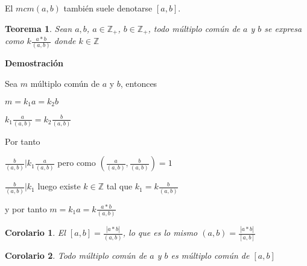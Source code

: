 \documentclass[a4paper,1pt]{report}
\newtheorem*{teo}{Teorema}
\newtheorem*{cor}{Corolario}
\begin{document}
El $mcm(a,b)$ también suele denotarse $[a,b]$.



\begin{teo}
 Sean $a,b$, $a\in\mathbb{Z}_+$, $b\in\mathbb{Z}_+$, todo múltiplo común de $a$ y $b$ se expresa como $k\frac{a*b}{(a,b)}$ donde $k\in\mathbb{Z}$
\end{teo}

\textbf{Demostración}


Sea $m$ múltiplo común de $a$ y $b$, entonces

$m=k_1a=k_2b$

$k_1\frac{a}{(a,b)}=k_2\frac{b}{(a,b)}$

Por tanto

$\frac{b}{(a,b)}|k_1\frac{a}{(a,b)}$ pero como $(\frac{a}{(a,b)},\frac{b}{(a,b)})=1$

$\frac{b}{(a,b)}|k_1$ luego existe $k\in\mathbb{Z}$ tal que $k_1=k\frac{b}{(a,b)}$

y por tanto $m=k_1a=k\frac{a*b}{(a,b)}$

\begin{cor}
 El $[a,b]=\frac{|a*b|}{(a,b)}$, lo que es lo mismo $(a,b)=\frac{|a*b|}{[a,b]}$
\end{cor}

\begin{cor}
 Todo múltiplo común de $a$ y $b$ es múltiplo común de $[a,b]$
\end{cor}
\end{document}
